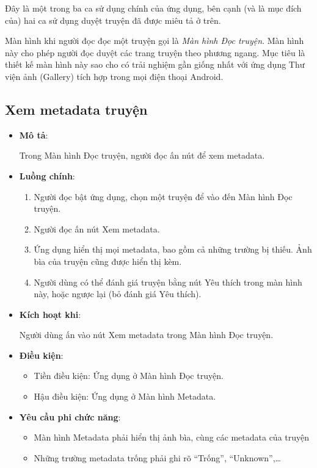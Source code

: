 \documentclass[../../thesis]{subfiles}
\begin{document}
Đây là một trong ba ca sử dụng chính của ứng dụng, bên cạnh (và là mục đích của)
hai ca sử dụng duyệt truyện đã được miêu tả ở trên.

Màn hình khi người đọc đọc một truyện gọi là \emph{Màn hình Đọc truyện}. Màn
hình này cho phép người đọc duyệt các trang truyện theo phương ngang. Mục tiêu
là thiết kế màn hình này sao cho có trải nghiệm gần giống nhất với ứng dụng Thư
viện ảnh (Gallery) tích hợp trong mọi điện thoại Android.

\subsection{Xem metadata truyện}\label{sec:view-metadata}

\begin{itemize}
    \item
        \textbf{Mô tả}:

        Trong Màn hình Đọc truyện, người đọc ấn nút để xem metadata.
    \item
        \textbf{Luồng chính}:

        \begin{enumerate}
            \item
                Người đọc bật ứng dụng, chọn một truyện để vào đến Màn hình Đọc
                truyện.
            \item
                Người đọc ấn nút Xem metadata.
            \item
                Ứng dụng hiển thị mọi metadata, bao gồm cả những trường bị
                thiếu. Ảnh bìa của truyện cũng được hiển thị kèm.
            \item
                Người dùng có thể đánh giá truyện bằng nút Yêu thích trong màn
                hình này, hoặc ngược lại (bỏ đánh giá Yêu thích).
        \end{enumerate}
    \item
        \textbf{Kích hoạt khi}:

        Người dùng ấn vào nút Xem metadata trong Màn hình Đọc truyện.
    \item
        \textbf{Điều kiện}:

        \begin{itemize}
            \item
                Tiền điều kiện: Ứng dụng ở Màn hình Đọc truyện.
            \item
                Hậu điều kiện: Ứng dụng ở Màn hình Metadata.
        \end{itemize}
    \item
        \textbf{Yêu cầu phi chức năng}:

        \begin{itemize}
            \item
                Màn hình Metadata phải hiển thị ảnh bìa, cùng các metadata của
                truyện
            \item
                Những trường metadata trống phải ghi rõ ``Trống'',
                ``Unknown'',\ldots{}
        \end{itemize}
  \end{itemize}
\end{document}
